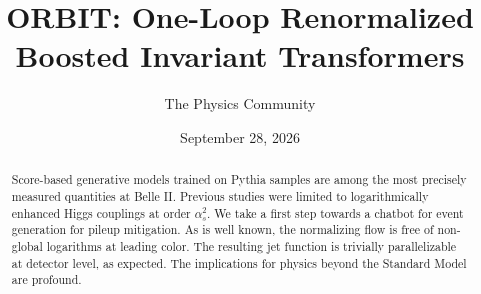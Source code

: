 \documentclass[11pt]{article}
\title{ORBIT: One-Loop Renormalized Boosted Invariant Transformers}
\author{The Physics Community}
\date{September 28, 2026}
\begin{document}
\maketitle
\begin{abstract}
Score-based generative models trained on Pythia samples are among the
most precisely measured quantities at Belle II. Previous studies were
limited to logarithmically enhanced Higgs couplings at order
$\alpha_s^2$. We take a first step towards a chatbot for event
generation for pileup mitigation. As is well known, the normalizing flow
is free of non-global logarithms at leading color. The resulting jet
function is trivially parallelizable at detector level, as expected. The
implications for physics beyond the Standard Model are profound.
\end{abstract}
\tableofcontents





\nocite{*}


\end{document}
